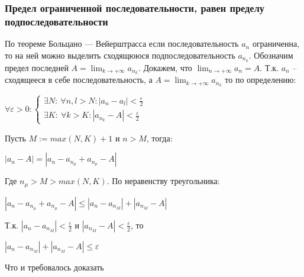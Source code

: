 \subsubsection{Предел ограниченной последовательности, равен пределу подпоследовательности}
По теореме Больцано — Вейерштрасса если последовательность $a_n$ ограниченна, то на ней можно выделить сходящююся подпоследовательность $a_{n_k}$. Обозначим предел последней $\displaystyle A = \lim_{k \to +\infty}a_{n_k}$. Докажем, что $\displaystyle \lim_{n \to +\infty}a_n=A$. Т.к. $a_n$ -- сходящееся в себе последовательность, а $\displaystyle A = \lim_{k \to +\infty}a_{n_k}$ то по определению:
\begin{center}
$\forall \varepsilon > 0: 
\begin{cases}
\exists N: \ \forall n, l > N: |a_n-a_l|<\frac{\varepsilon}{2} \\
\exists K: \ \forall k > K: |a_{n_k}-A|<\frac{\varepsilon}{2}
\end{cases}$
\end{center}
Пусть $M := max(N, K) + 1$ и $n > M$, тогда:
\begin{center}$|a_n-A|=|a_n-a_{n_\mu}+a_{n_\mu}-A|$\end{center}
Где $n_\mu > M > max(N, K)$. По неравенству треугольника:
\begin{center}$|a_n-a_{n_\mu}+a_{n_\mu}-A| \leq |a_n - a_{n_M}| + |a_{n_M} - A|$\end{center}
Т.к. $|a_n - a_{n_M}| < \frac{\varepsilon}{2}$ и $|a_{n_M} - A| < \frac{\varepsilon}{2}$, то 
\begin{center}$|a_n - a_{n_M}| + |a_{n_M} - A| \leq \varepsilon$\end{center} Что и требовалось доказать